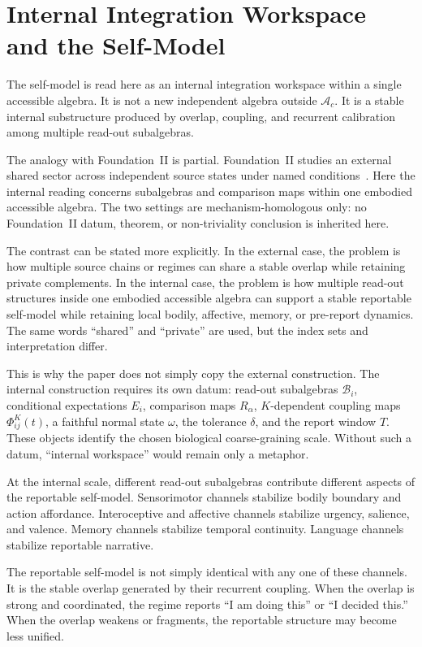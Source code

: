 \documentclass[12pt]{article}
\theoremstyle{definition}
\theoremstyle{remark}
\newcommand{\Ac}{\mathcal A_c}
\begin{document}
\section{Internal Integration Workspace and the Self-Model}

The self-model is read here as an internal integration workspace within a
single accessible algebra. It is not a new independent algebra outside
\(\Ac\). It is a stable internal substructure produced by overlap,
coupling, and recurrent calibration among multiple read-out
subalgebras.

The analogy with Foundation~II is partial. Foundation~II studies an
external shared sector across independent source states under named
conditions~\cite{FoundationII}. Here the internal reading concerns
subalgebras and comparison maps within one embodied accessible algebra.
The two settings are mechanism-homologous only: no Foundation~II datum,
theorem, or non-triviality conclusion is inherited here.

The contrast can be stated more explicitly. In the external case, the
problem is how multiple source chains or regimes can share a stable
overlap while retaining private complements. In the internal case, the
problem is how multiple read-out structures inside one embodied
accessible algebra can support a stable reportable self-model while
retaining local bodily, affective, memory, or pre-report dynamics. The
same words ``shared'' and ``private'' are used, but the index sets and
interpretation differ.

This is why the paper does not simply copy the external construction.
The internal construction requires its own datum: read-out subalgebras
\(\mathcal B_i\), conditional expectations \(E_i\), comparison maps
\(R_\alpha\), \(K\)-dependent coupling maps \(\Phi_{ij}^{K}(t)\), a
faithful normal state \(\omega\), the tolerance \(\delta\), and the
report window \(T\). These objects identify the chosen biological
coarse-graining scale. Without such a datum, ``internal workspace''
would remain only a metaphor.

At the internal scale, different read-out subalgebras contribute
different aspects of the reportable self-model. Sensorimotor channels
stabilize bodily boundary and action affordance. Interoceptive and
affective channels stabilize urgency, salience, and valence. Memory
channels stabilize temporal continuity. Language channels stabilize
reportable narrative.

The reportable self-model is not simply identical with any one of these
channels. It is the stable overlap generated by their recurrent
coupling. When the overlap is strong and coordinated, the regime reports
``I am doing this'' or ``I decided this.'' When the overlap weakens or
fragments, the reportable structure may become less unified.
\end{document}
